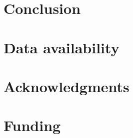 \documentclass[hidelinks]{article}
\begin{document}
\section*{Conclusion}
    \label{conclusion}

\section*{Data availability}\label{data_availability}


\section*{Acknowledgments}\label{acknowledgements}

\section*{Funding}
    \label{funding}


\end{document}
